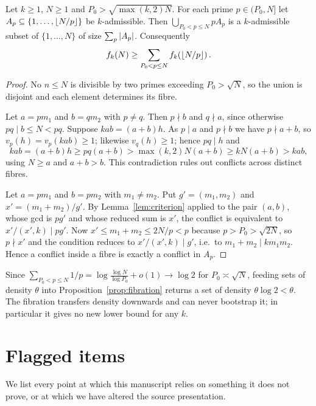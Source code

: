 \documentclass[11pt]{article}
\begin{document}
\begin{proposition}[fibration]\label{prop:fibration}
Let \(k\geq1\), \(N\geq1\) and \(P_0>\sqrt{\max(k,2)N}\). For each prime
\(p\in(P_0,N]\) let \(A_p\subseteq\{1,\ldots,\left\lfloor N/p\right\rfloor\}\) be
\(k\)-admissible. Then \(\bigcup_{P_0<p\leq N}pA_p\) is a \(k\)-admissible
subset of \(\{1,\ldots,N\}\) of size \(\sum_p\left|A_p\right|\). Consequently
\[
 f_k(N)\geq\sum_{P_0<p\leq N}f_k\!\left(\left\lfloor N/p\right\rfloor\right).
\]
\end{proposition}

\begin{proof}
No \(n\leq N\) is divisible by two primes exceeding \(P_0>\sqrt N\), so the
union is disjoint and each element determines its fibre.

Let \(a=pm_1\) and \(b=qm_2\) with \(p\ne q\). Then \(p\nmid b\) and
\(q\nmid a\), since otherwise \(pq\mid b\leq N<pq\). Suppose
\(kab=(a+b)h\). As \(p\mid a\) and \(p\nmid b\) we have \(p\nmid a+b\), so
\(v_p(h)=v_p(kab)\geq1\); likewise \(v_q(h)\geq1\); hence \(pq\mid h\) and
\[
 kab=(a+b)h\geq pq(a+b)>\max(k,2)N(a+b)\geq kN(a+b)>kab,
\]
using \(N\geq a\) and \(a+b>b\). This contradiction rules out conflicts
across distinct fibres.

Let \(a=pm_1\) and \(b=pm_2\) with \(m_1\ne m_2\). Put \(g'=(m_1,m_2)\) and
\(x'=(m_1+m_2)/g'\). By Lemma~\ref{lem:criterion} applied to the pair \((a,b)\),
whose gcd is \(pg'\) and whose reduced sum is \(x'\), the conflict is
equivalent to \(x'/(x',k)\mid pg'\). Now
\(x'\leq m_1+m_2\leq 2N/p<p\) because \(p>P_0>\sqrt{2N}\), so \(p\nmid x'\)
and the condition reduces to \(x'/(x',k)\mid g'\), i.e.\ to
\(m_1+m_2\mid km_1m_2\). Hence a conflict inside a fibre is exactly a
conflict in \(A_p\).
\end{proof}

\begin{remark}
Since \(\sum_{P_0<p\leq N}1/p=\log\frac{\log N}{\log P_0}+o(1)\to\log2\) for
\(P_0\asymp\sqrt N\), feeding sets of density \(\theta\) into
Proposition~\ref{prop:fibration} returns a set of density \(\theta\log2<\theta\). The
fibration transfers density downwards and can never bootstrap it; in
particular it gives no new lower bound for any \(k\).
\end{remark}

\section{Flagged items}\label{sec:gaps}

We list every point at which this manuscript relies on something it does not
prove, or at which we have altered the source presentation.
\end{document}
